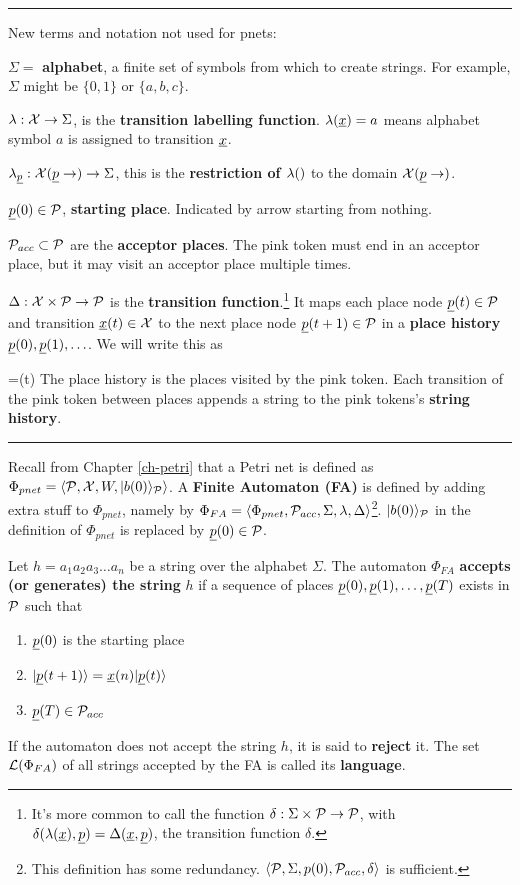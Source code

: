 \hrule
New terms and notation not used for pnets:

$\Sigma=$ {\bf alphabet}, a finite set of symbols
from which to create strings. For example,
$\Sigma$ might be $\{0, 1\}$ or $\{a, b, c\}$.

$\lambda:{\cal X}\rightarrow\Sigma$, is the {\bf transition labelling function}. $\lam(\rvx)=a$ means alphabet symbol $a$ is assigned to transition $\rvx$.  


$\lam_\rvp:\calx(\rvp\rarrow)\rarrow\Sigma$, this is the {\bf restriction of $\lambda()$}
to the domain $\calx(\rvp\rarrow)$.


$\rvp(0)\in \calp$, {\bf starting place}. Indicated by arrow starting from nothing.



${\cal P}_{acc}\subset {\cal P}$ are the 
{\bf acceptor places}. The pink token must end in an acceptor place, but it may visit
an acceptor place multiple times.


$\Delta:{\cal X}\times{\cal P}\rightarrow {\cal P}$ is the 
{\bf transition function}.\footnote{It's more common to call the function $\delta:\Sigma\times{\cal P}\rightarrow {\cal P}$, with $\delta(\lam(\rvx), \rvp)=\Delta(\rvx, \rvp)$, 
the
transition function $\delta$.}
It maps each place node $\rvp(t)\in\calp$ and transition $\rvx(t)\in\calx$ to the next place node $\rvp(t+1)\in\calp$ in a {\bf place history} $\rvp(0), \rvp(1), \ldots$. We will write this as

\beq
{}=\rvx(t)
\eeq
The place history is the places visited by the pink token. Each transition of
the pink token  between places appends a string
to the pink tokens's {\bf string history}.




\hrule
Recall from Chapter \ref{ch-petri} that a Petri net is defined as $\Phi_{pnet} = \left\langle{\cal P}, {\cal X}, W,|b(0)\rangle_{\cal P}\right\rangle$.
A {\bf Finite Automaton (FA)}
is defined by adding extra stuff to
$\Phi_{pnet}$, namely by
$\Phi_{FA}=\left\langle\Phi_{pnet},{\cal P}_{acc}, \Sigma, \lambda, \Delta\right\rangle$\footnote{This definition has some redundancy.  
$\left\langle{\cal P}, \Sigma, p(0), {\cal P}_{acc}, \delta\right\rangle$
is sufficient.}.
$|b(0)\rangle_{\cal P}$ in the definition
of $\Phi_{pnet}$ is replaced by
$\rvp(0)\in\calp$.

Let $h=a_1a_2a_3\ldots a_n$ be a string
over the alphabet $\Sigma$.
The automaton $\Phi_{FA}$ {\bf accepts (or generates) the string} $h$
if a sequence of places $\rvp(0), \rvp(1), \ldots, \rvp(T)$ exists
in ${\cal P}$ such that 
\begin{enumerate}
\item $\rvp(0)$  is the starting place
\item $\ket{\rvp(t+1) }= \rvx(n)\ket{\rvp(t)}$
\item $\rvp(T)\in \calp_{acc}$
\end{enumerate}
If the automaton does not accept the string $h$,
it is said to {\bf reject} it. The set ${\cal L}(\Phi_{FA})$ of all strings 
accepted by the FA is called its {\bf language}.

